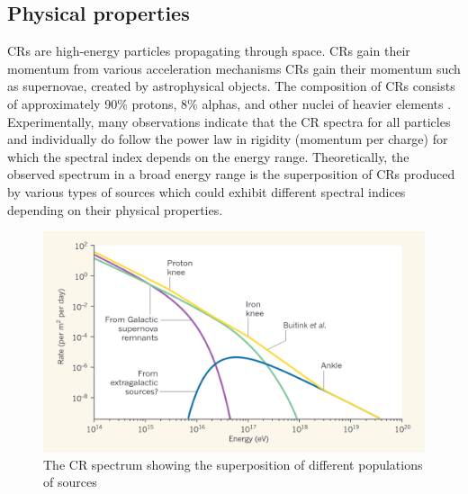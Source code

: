 \subsection{Physical properties}
CRs are high-energy particles propagating through
space. CRs gain their momentum from
various acceleration mechanisms CRs gain their momentum
such as supernovae, created by astrophysical objects.
The composition of CRs consists of approximately
90\% protons, 8\% alphas, and other nuclei of heavier
elements \citep{CRComposition2017}. Experimentally,
many observations indicate that the CR spectra for all particles
and individually do follow the power law in rigidity
(momentum per charge)
for which the spectral index depends on the
energy range. Theoretically, the observed spectrum
in a broad energy range
is the superposition of CRs produced by various types of
sources which could exhibit different spectral indices
depending on their physical properties.



\begin{figure}[h!]
    \centering
    \includegraphics[width=\textwidth]{content/background/figures/andrew_superposition.png}
    \caption{
        The CR spectrum showing the superposition of different
        populations of sources
        \citep{taylor2016_crspectrumsuperposition}
    }
    \label{fig:cr_superposition}
\end{figure}

